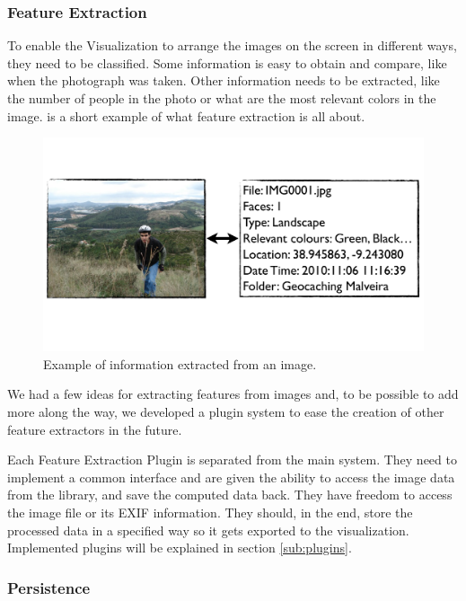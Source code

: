 \subsubsection{Feature Extraction} %
\label{ssub:FeatureExtraction}

To enable the Visualization to arrange the images on the screen in different ways, they need to be classified. Some information is easy to obtain and compare, like when the photograph was taken. Other information needs to be extracted, like the number of people in the photo or what are the most relevant colors in the image.  is a short example of what feature extraction is all about.

\begin{figure}[ht]
	\centering
		\includegraphics[width=0.72\columnwidth]{Figures/fe.pdf}
	\caption{Example of information extracted from an image.}
	\label{fig:fe}
\end{figure}

We had a few ideas for extracting features from images and, to be possible to add more along the way, we developed a plugin system to ease the creation of other feature extractors in the future.

Each Feature Extraction Plugin is separated from the main system. They need to implement a common interface and are given the ability to access the image data from the library, and save the computed data back. They have freedom to access the image file or its \ac{EXIF} information. They should, in the end, store the processed data in a specified way so it gets exported to the visualization. Implemented plugins will be explained in section \ref{sub:plugins}.





\subsubsection{Persistence} %
\label{ssub:Persistence}

